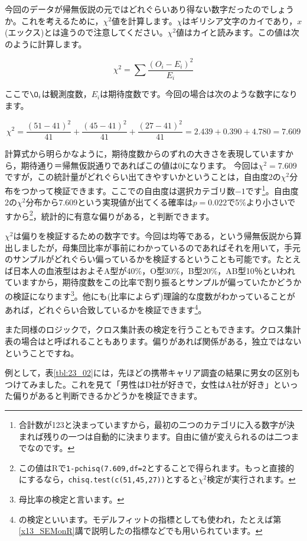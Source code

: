\documentclass{ltjsbook}
\begin{document}
今回のデータが帰無仮説の元ではどれぐらいあり得ない数字だったのでしょうか。これを考えるために，$\chi^2$値を計算します。$\chi$はギリシア文字のカイであり，$x$(エックス)とは違うので注意してください。$\chi^2$値はカイと読みます。この値は次のように計算します。

\[ \chi^2 = \sum \frac{(O_i - E_i)^2}{E_i} \]

ここで$\O_i$は観測度数，$E_i$は期待度数です。今回の場合は次のような数字になります。

\[ \chi^2 = \frac{(51-41)^2}{41} + \frac{(45-41)^2}{41} + \frac{(27-41)^2}{41} = 2.439+0.390+4.780=7.609 \]

計算式から明らかなように，期待度数からのずれの大きさを表現していますから，期待通り＝帰無仮説通りであればこの値は0になります。
今回は$\chi^2=7.609$ですが，この統計量がどれぐらい出てきやすいかということは，自由度2の$\chi^2$分布をつかって検証できます。ここでの自由度は選択カテゴリ数$-1$です\footnote{合計数が123と決まっていますから，最初の二つのカテゴリに入る数字が決まれば残りの一つは自動的に決まります。自由に値が変えられるのは二つまでなのです。}。自由度2の$\chi^2$分布から7.609という実現値が出てくる確率は$p=0.022$で5\%より小さいですから\footnote{この値はRで\verb|1-pchisq(7.609,df=2|とすることで得られます。もっと直接的にするなら，\verb|chisq.test(c(51,45,27))|とすると$\chi^2$検定が実行されます。}，統計的に有意な偏りがある，と判断できます。

$\chi^2$は偏りを検証するための数字です。今回は均等である，という帰無仮説から算出しましたが，母集団比率が事前にわかっているのであればそれを用いて，手元のサンプルがどれぐらい偏っているかを検証するということも可能です。たとえば日本人の血液型はおよそA型が40\%，O型30\%，B型20\%，AB型10％といわれていますから，期待度数をこの比率で割り振るとサンプルが偏っていたかどうかの検証になります\footnote{母比率の検定と言います。}。他にも(比率によらず)理論的な度数がわかっていることがあれば，どれぐらい合致しているかを検証できます\footnote{の検定といいます。モデルフィットの指標としても使われ，たとえば第\ref{x13_SEMonR}講で説明したの指標などでも用いられています。}。

また同様のロジックで，クロス集計表の検定を行うこともできます。クロス集計表の場合はと呼ばれることもあります。偏りがあれば関係がある，独立ではないということですね。

例として，表\ref{tbl:23_02}には，先ほどの携帯キャリア調査の結果に男女の区別もつけてみました。これを見て「男性はD社が好きで，女性はA社が好き」といった偏りがあると判断できるかどうかを検証できます。
\end{document}
